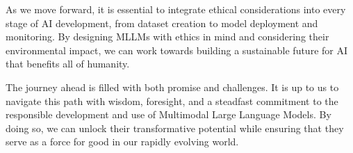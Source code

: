 As we move forward, it is essential to integrate ethical considerations into every stage of AI development, from dataset creation to model deployment and monitoring. By designing MLLMs with ethics in mind and considering their environmental impact, we can work towards building a sustainable future for AI that benefits all of humanity.

The journey ahead is filled with both promise and challenges. It is up to us to navigate this path with wisdom, foresight, and a steadfast commitment to the responsible development and use of Multimodal Large Language Models. By doing so, we can unlock their transformative potential while ensuring that they serve as a force for good in our rapidly evolving world.


